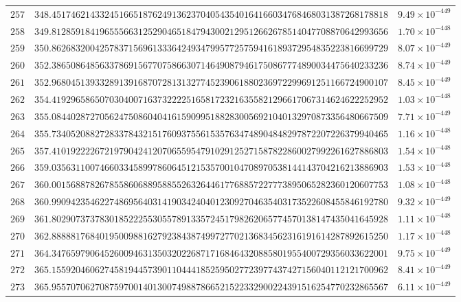 \documentclass[12pt,reqno]{amsart}
\theoremstyle{remark}
\begin{document}
\begin{longtable}{clc}
$257$ & $348.4517462143324516651876249136237040543540164166034768468031387268178818$ & $9.49\times 10^{-449}$ \\
$258$ & $349.8128591841965556631252904651847943002129512662678514047708870642993656$ & $1.70\times 10^{-448}$ \\
$259$ & $350.8626832004257837156961333642493479957725759416189372954835223816699729$ & $8.07\times 10^{-449}$ \\
$260$ & $352.3865086485633786915677075866307146490879461750867774890034475640233236$ & $8.74\times 10^{-449}$ \\
$261$ & $352.9680451393328913916870728131327745239061880236972299691251166724900107$ & $8.45\times 10^{-449}$ \\
$262$ & $354.4192965865070304007163732222516581723216355821296617067314624622252952$ & $1.03\times 10^{-448}$ \\
$263$ & $355.0844028727056247508604041615909951882830056921040132970873356480667509$ & $7.71\times 10^{-449}$ \\
$264$ & $355.7340520882728337843215176093755615357634748904848297872207226379940465$ & $1.16\times 10^{-448}$ \\
$265$ & $357.4101922226721979042412070655954791029125271587822860027992261627886803$ & $1.54\times 10^{-448}$ \\
$266$ & $359.0356311007466033458997860645121535700104708970538144143704216213886903$ & $1.53\times 10^{-448}$ \\
$267$ & $360.0015688782678558606889588552632644617768857227773895065282360120607753$ & $1.08\times 10^{-448}$ \\
$268$ & $360.9909423546227486956403141903424040123092704635403173522608455846192780$ & $9.32\times 10^{-449}$ \\
$269$ & $361.8029073737830185222553055789133572451798262065774570138147435041645928$ & $1.11\times 10^{-448}$ \\
$270$ & $362.8888817684019500988162792384387499727702136834562316191614287892615250$ & $1.17\times 10^{-448}$ \\
$271$ & $364.3476597906452600946313503202268717168464320885801955400729356033622001$ & $9.75\times 10^{-449}$ \\
$272$ & $365.1559204606274581944573901104441852595027723977437427156040112121700962$ & $8.41\times 10^{-449}$ \\
$273$ & $365.9557070627087597001401300749887866521522332900224391516254770232865567$ & $6.11\times 10^{-449}$ \\

\end{longtable}
\end{document}
